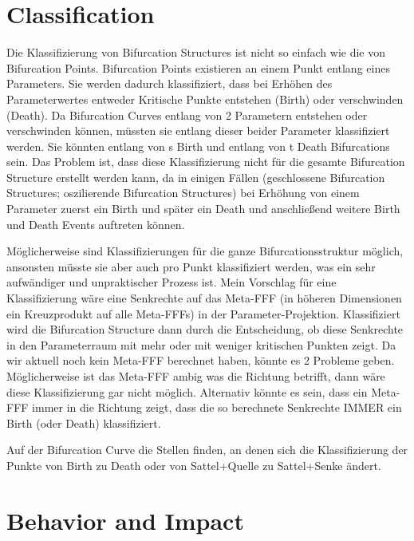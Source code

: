 \documentclass[11pt]{article}
\begin{document}
\section{Classification}
Die Klassifizierung von Bifurcation Structures ist nicht so einfach wie die von Bifurcation Points.
Bifurcation Points existieren an einem Punkt entlang eines Parameters. Sie werden dadurch klassifiziert, dass bei Erhöhen des Parameterwertes entweder Kritische Punkte entstehen (Birth) oder verschwinden (Death).
Da Bifurcation Curves entlang von 2 Parametern entstehen oder verschwinden können, müssten sie entlang dieser beider Parameter klassifiziert werden.
Sie könnten entlang von s Birth und entlang von t Death Bifurcations sein.
Das Problem ist, dass diese Klassifizierung nicht für die gesamte Bifurcation Structure erstellt werden kann, da in einigen Fällen (geschlossene Bifurcation Structures; oszilierende Bifurcation Structures) bei Erhöhung von einem Parameter zuerst ein Birth und später ein Death und anschließend weitere Birth und Death Events auftreten können.

Möglicherweise sind Klassifizierungen für die ganze Bifurcationsstruktur möglich, ansonsten müsste sie aber auch pro Punkt klassifiziert werden, was ein sehr aufwändiger und unpraktischer Prozess ist.
Mein Vorschlag für eine Klassifizierung wäre eine Senkrechte auf das Meta-FFF (in höheren Dimensionen ein Kreuzprodukt auf alle Meta-FFFs) in der Parameter-Projektion. Klassifiziert wird die Bifurcation Structure dann durch die Entscheidung, ob diese Senkrechte in den Parameterraum mit mehr oder mit weniger kritischen Punkten zeigt.
Da wir aktuell noch kein Meta-FFF berechnet haben, könnte es 2 Probleme geben. Möglicherweise ist das Meta-FFF ambig was die Richtung betrifft, dann wäre diese Klassifizierung gar nicht möglich. Alternativ könnte es sein, dass ein Meta-FFF immer in die Richtung zeigt, dass die so berechnete Senkrechte IMMER ein Birth (oder Death) klassifiziert.

Auf der Bifurcation Curve die Stellen finden, an denen sich die Klassifizierung der Punkte von Birth zu Death oder von Sattel+Quelle zu Sattel+Senke ändert.
\section{Behavior and Impact}
\end{document}
